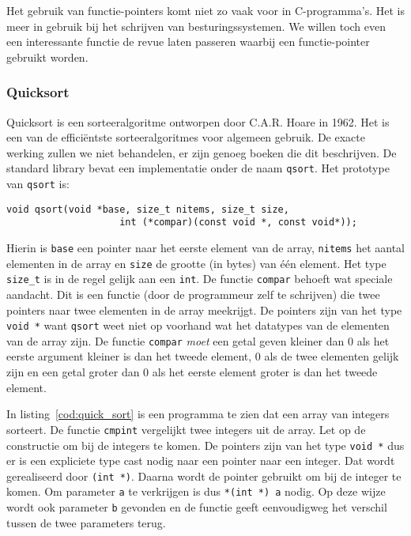 Het gebruik van functie-pointers komt niet zo vaak voor in C-programma's. Het is meer in gebruik bij het schrijven van besturingssystemen. We willen toch even een interessante functie de revue laten passeren waarbij een functie-pointer gebruikt worden.

\subsubsection*{Quicksort}
Quicksort is een sorteeralgoritme ontworpen door C.A.R. Hoare in 1962. Het is een van de efficiëntste sorteeralgoritmes voor algemeen gebruik. De exacte werking zullen we niet behandelen, er zijn genoeg boeken die dit beschrijven. De standard library bevat een implementatie onder de naam \texttt{qsort}. Het prototype van \texttt{qsort} is:


\begin{lstlisting}[style=lstoneline]
void qsort(void *base, size_t nitems, size_t size,
                    int (*compar)(const void *, const void*));
\end{lstlisting}

Hierin is \texttt{base} een pointer naar het eerste element van de array, \texttt{nitems} het aantal elementen in de array en \texttt{size} de grootte (in bytes) van één element. Het type \texttt{size\_t} is in de regel gelijk aan een \texttt{int}. De functie \texttt{compar} behoeft wat speciale aandacht. Dit is een functie (door de programmeur zelf te schrijven) die twee pointers naar twee elementen in de array meekrijgt. De pointers zijn van het type \texttt{void~*} want \texttt{qsort} weet niet op voorhand wat het datatypes van de elementen van de array zijn. De functie \texttt{compar} \textsl{moet} een getal geven kleiner dan 0 als het eerste argument kleiner is dan het tweede element, 0 als de twee elementen gelijk zijn en een getal groter dan 0 als het eerste element groter is dan het tweede element.

In listing~\ref{cod:quick_sort} is een programma te zien dat een array van integers sorteert. De functie \texttt{cmpint} vergelijkt twee integers uit de array. Let op de constructie om bij de integers te komen. De pointers zijn van het type \texttt{void~*} dus er is een expliciete type cast nodig naar een pointer naar een integer. Dat wordt gerealiseerd door \texttt{(int~*)}. Daarna wordt de pointer gebruikt om bij de integer te komen. Om parameter \texttt{a} te verkrijgen is dus \texttt{*(int~*)~a} nodig. Op deze wijze wordt ook parameter \texttt{b} gevonden en de functie geeft eenvoudigweg het verschil tussen de twee parameters terug.

